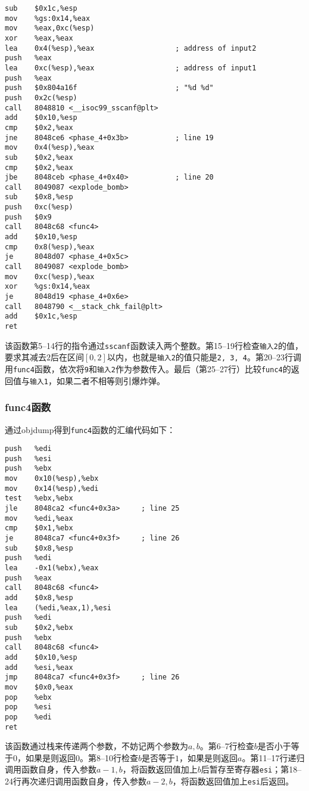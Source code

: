 \documentclass[a4paper, 11pt]{ctexart}
\begin{document}
\begin{verbatim}
sub    $0x1c,%esp
mov    %gs:0x14,%eax
mov    %eax,0xc(%esp)
xor    %eax,%eax
lea    0x4(%esp),%eax                   ; address of input2
push   %eax
lea    0xc(%esp),%eax                   ; address of input1
push   %eax
push   $0x804a16f                       ; "%d %d"
push   0x2c(%esp)
call   8048810 <__isoc99_sscanf@plt>
add    $0x10,%esp
cmp    $0x2,%eax
jne    8048ce6 <phase_4+0x3b>           ; line 19
mov    0x4(%esp),%eax
sub    $0x2,%eax
cmp    $0x2,%eax
jbe    8048ceb <phase_4+0x40>           ; line 20
call   8049087 <explode_bomb>
sub    $0x8,%esp
push   0xc(%esp)
push   $0x9
call   8048c68 <func4>
add    $0x10,%esp
cmp    0x8(%esp),%eax
je     8048d07 <phase_4+0x5c>
call   8049087 <explode_bomb>
mov    0xc(%esp),%eax
xor    %gs:0x14,%eax
je     8048d19 <phase_4+0x6e>
call   8048790 <__stack_chk_fail@plt>
add    $0x1c,%esp
ret
\end{verbatim}

该函数第5--14行的指令通过\texttt{sscanf}函数读入两个整数。第15--19行检查\texttt{输入2}的值，要求其减去$2$后在区间$[0,2]$以内，也就是\texttt{输入2}的值只能是\texttt{2, 3, 4}。第20--23行调用\texttt{func4}函数，依次将\texttt{9}和\texttt{输入2}作为参数传入。最后（第25--27行）比较\texttt{func4}的返回值与\texttt{输入1}，如果二者不相等则引爆炸弹。

\subsubsection{func4函数}
通过objdump得到\texttt{func4}函数的汇编代码如下：

\begin{verbatim}
push   %edi
push   %esi
push   %ebx
mov    0x10(%esp),%ebx
mov    0x14(%esp),%edi
test   %ebx,%ebx
jle    8048ca2 <func4+0x3a>     ; line 25
mov    %edi,%eax
cmp    $0x1,%ebx
je     8048ca7 <func4+0x3f>     ; line 26
sub    $0x8,%esp
push   %edi
lea    -0x1(%ebx),%eax
push   %eax
call   8048c68 <func4>
add    $0x8,%esp
lea    (%edi,%eax,1),%esi
push   %edi
sub    $0x2,%ebx
push   %ebx
call   8048c68 <func4>
add    $0x10,%esp
add    %esi,%eax
jmp    8048ca7 <func4+0x3f>     ; line 26
mov    $0x0,%eax
pop    %ebx
pop    %esi
pop    %edi
ret
\end{verbatim}

该函数通过栈来传递两个参数，不妨记两个参数为$a, b$。第6--7行检查$b$是否小于等于$0$，如果是则返回$0$。第8--10行检查$b$是否等于$1$，如果是则返回$a$。第11--17行递归调用函数自身，传入参数$a-1, b$，将函数返回值加上$b$后暂存至寄存器\texttt{esi}；第18--24行再次递归调用函数自身，传入参数$a-2, b$，将函数返回值加上\texttt{esi}后返回。
\end{document}
